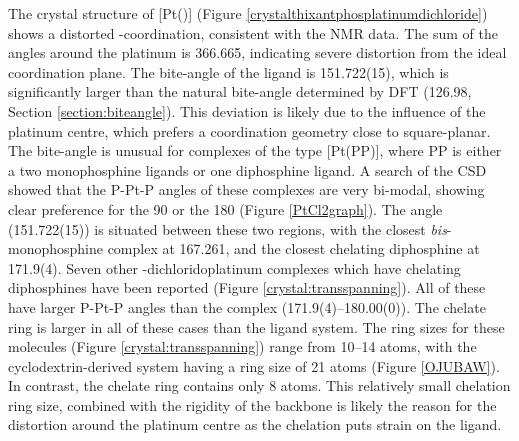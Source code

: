 The crystal structure of [Pt(\tButhixantphos)] (Figure \ref{crystalthixantphosplatinumdichloride}) shows a distorted \trans-coordination, consistent with the NMR data.  The sum of the angles around the platinum is 366.665\degrees{}, indicating severe distortion from the ideal coordination plane. The bite-angle of the ligand is 151.722(15)\degrees{}, which is significantly larger than the natural bite-angle determined by DFT (126.98\degrees{}, Section \ref{section:biteangle}).  This deviation is likely due to the influence of the platinum centre, which prefers a coordination geometry close to square-planar.  The bite-angle is unusual for complexes of the type [Pt(PP)], where PP is either a two monophosphine ligands or one diphosphine ligand.  A search of the \gls{CSD} showed that the P-Pt-P angles of these complexes are very bi-modal, showing clear preference for the \cis{} 90\degrees{} or the \trans{} 180\degrees{} (Figure \ref{PtCl2graph}).\cite{Allen2002}  The \tButhixantphos{} angle (151.722(15)\degrees) is situated between these two regions, with the closest \emph{bis}-monophosphine complex at 167.261, and the closest chelating diphosphine at 171.9(4)\degrees{}.  Seven other \trans{}-dichloridoplatinum complexes which have chelating diphosphines have been reported (Figure \ref{crystal:transspanning}).\cite{Bachechi1992, Engeldinger2003, Newman2012, Owens2008, Beuken1997, Freixa2003b, Ruhland2007}  All of these have larger P-Pt-P angles than the \tButhixantphos{} complex (171.9(4)--180.00(0)\degrees{}).  The chelate ring is larger in all of these cases than the \tButhixantphos{} ligand system.  The ring sizes for these molecules (Figure \ref{crystal:transspanning}) range from 10--14 atoms, with the cyclodextrin-derived system having a ring size of 21 atoms (Figure \ref{OJUBAW}).  In contrast, the \tButhixantphos{} chelate ring contains only 8 atoms.  This relatively small chelation ring size, combined with the rigidity of the backbone is likely the reason for the distortion around the platinum centre as the \trans{} chelation puts strain on the \tButhixantphos{} ligand.  

